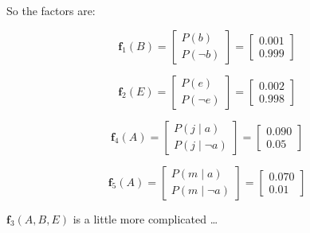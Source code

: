 \documentclass[11pt]{article}
\begin{document}
So the factors are:




\begin{equation*}
\bm{f}_1(B) =
\begin{bmatrix}
P(b) \\
P(\neg b)
\end{bmatrix}
=
\begin{bmatrix}
0.001 \\
0.999
\end{bmatrix}
\end{equation*}




\begin{equation*}
\bm{f}_2(E) =
\begin{bmatrix}
P(e) \\
P(\neg e)
\end{bmatrix}
=
\begin{bmatrix}
0.002 \\
0.998
\end{bmatrix}
\end{equation*}




\vspace{.2in}




\begin{equation*}
\bm{f}_4(A) =
\begin{bmatrix}
P(j \mid a) \\
P(j \mid \neg a)
\end{bmatrix}
=
\begin{bmatrix}
0.090 \\
0.05
\end{bmatrix}
\end{equation*}




\begin{equation*}
\bm{f}_5(A) =
\begin{bmatrix}
P(m \mid a) \\
P(m \mid \neg a)
\end{bmatrix}
=
\begin{bmatrix}
0.070 \\
0.01
\end{bmatrix}
\end{equation*}





\vspace{.2in}

\(\bm{f}_3(A, B, E)\) is a little more complicated \ldots{}
\end{document}
